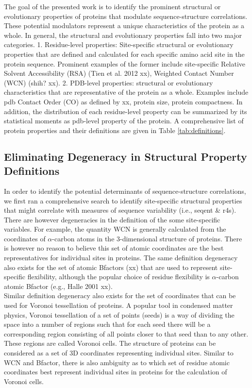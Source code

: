 \documentclass[11pt]{article}
\begin{document}
    The goal of the presented work is to identify the prominent structural or evolutionary properties of proteins that modulate sequence-structure correlations. These potential modulators represent a unique characteristics of the protein as a whole.  In general, the structural and evolutionary properties fall into two major categories. 1. Residue-level properties: Site-specific structural or evolutionary properties that are defined and calculated for each specific amino acid site in the protein sequence. Prominent examples of the former include site-specific Relative Solvent Accessibility (RSA) (Tien et al. 2012 xx), Weighted Contact Number (WCN) (shih? xx).   2. PDB-level properties: structural or evolutionary characteristics that are representative of the protein as a whole. Examples include pdb Contact Order (CO) as defined by xx, protein size, protein compactness.  In addition, the distribution of each residue-level property can be summarized by its statistical moments as pdb-level property of the protein. A comprehensive list of protein properties and their definitions are given in Table \ref{tab:definitions}.

    \subsection*{Eliminating Degeneracy in Structural Property Definitions}

    In order to identify the potential determinants of sequence-structure correlations, we first ran a comprehensive search to identify site-specific structural properties that might correlate with measures of sequence variability (i.e., seqent \& r4s). There are however degeneracies in the definition of the some site-specific variables. For example, the quantity WCN is generally calculated from the coordinates of $\alpha$-carbon atoms in the 3-dimensional structure of proteins. There is however no reason to believe this set of atomic coordinates are the best representatives for individual sites in proteins. The same definition degeneracy also exists for the set of atomic Bfactors (xx) that are used to represent site-specific flexibility, although the popular choice of residue flexibility is $\alpha$-carbon atomic Bfactor (e.g., Halle 2001 xx).
    \\

    Similar definition degeneracy also exists for the set of coordinates that can be used for Voronoi tessellation of proteins. A popular tool in condensed matter physics, Voronoi tessellation of a set of points (seeds) is a way of dividing the space into a number of regions such that for each seed there will be a corresponding region consisting of all points closer to that seed than to any other. These regions are called Voronoi cells. The structure of proteins can be considered as a set of 3D coordinates representing individual sites. Similar to WCN and Bfactor, there is also ambiguity as to which set of residue atomic coordinates best represent individual sites in proteins for the calculation of Voronoi cells.
    \\
\end{document}
